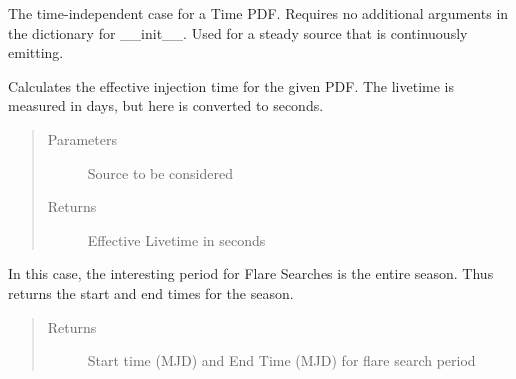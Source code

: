\documentclass[letterpaper,10pt,english]{sphinxmanual}
\begin{document}
\begin{fulllineitems}
\label{\detokenize{index:flarestack.core.time_pdf.Steady}}
The time-independent case for a Time PDF. Requires no additional
arguments in the dictionary for \_\_init\_\_. Used for a steady source that
is continuously emitting.

\begin{fulllineitems}
\label{\detokenize{index:flarestack.core.time_pdf.Steady.effective_injection_time}}
Calculates the effective injection time for the given PDF.
The livetime is measured in days, but here is converted to seconds.
\begin{quote}\begin{description}
\item[{Parameters}] \leavevmode
{} \textendash{} Source to be considered

\item[{Returns}] \leavevmode
Effective Livetime in seconds

\end{description}\end{quote}

\end{fulllineitems}


\begin{fulllineitems}
\label{\detokenize{index:flarestack.core.time_pdf.Steady.flare_time_mask}}
In this case, the interesting period for Flare Searches is the
entire season. Thus returns the start and end times for the season.
\begin{quote}\begin{description}
\item[{Returns}] \leavevmode
Start time (MJD) and End Time (MJD) for flare search period


\end{description}
\end{quote}
\end{fulllineitems}
\end{fulllineitems}
\end{document}
